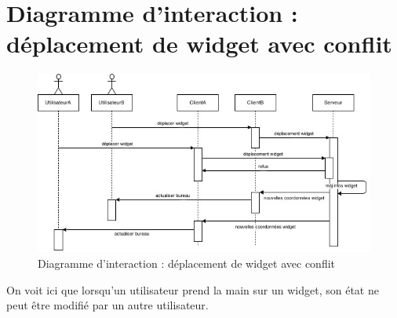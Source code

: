 \section{Diagramme d'interaction : déplacement de widget avec conflit}
\begin{figure}[H]
	\centering
	\includegraphics[angle=90]{diagrammes/DI3.jpg}
	\caption{Diagramme d'interaction : déplacement de widget avec conflit}
\end{figure}

On voit ici que lorsqu'un utilisateur prend la main sur un widget, son état ne peut être modifié par un autre utilisateur.